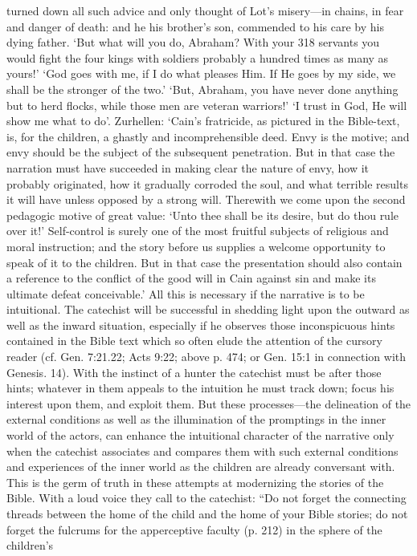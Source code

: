 turned down all such advice and only thought of Lot’s misery—in chains, in fear and danger of death: and he his brother’s son, commended to his care by his dying father. ‘But what will you do, Abraham? With your 318 servants you would fight the four kings with soldiers probably a hundred times as many as yours!’ ‘God goes with me, if I do what pleases Him. If He goes by my side, we shall be the stronger of the two.’ ‘But, Abraham, you have never done anything but to herd flocks, while those men are veteran warriors!’ ‘I trust in God, He will show me what to do’. Zurhellen: ‘Cain’s fratricide, as pictured in the Bible-text, is, for the children, a ghastly and incomprehensible deed. Envy is the motive; and envy should be the subject of the subsequent penetration. But in that case the narration must have succeeded in making clear the nature of envy, how it probably originated, how it gradually corroded the soul, and what terrible results it will have unless opposed by a strong will. Therewith we come upon the second pedagogic motive of great value: ‘Unto thee shall be its desire, but do thou rule over it!’ Self-control is surely one of the most fruitful subjects of religious and moral instruction; and the story before us supplies a welcome opportunity to speak of it to the children. But in that case the presentation should also contain a reference to the conflict of the good will in Cain against sin and make its ultimate defeat conceivable.’ All this is necessary if the narrative is to be intuitional. The catechist will be successful in shedding light upon the outward as well as the inward situation, especially if he observes those inconspicuous hints contained in the Bible text which so often elude the attention of the cursory reader (cf. Gen. 7:21.22; Acts 9:22; above p. 474; or Gen. 15:1 in connection with Genesis. 14). With the instinct of a hunter the catechist must be after those hints; whatever in them appeals to the intuition he must track down; focus his interest upon them, and exploit them. But these processes—the delineation of the external conditions as well as the illumination of the promptings in the inner world of the actors, can enhance the intuitional character of the narrative only when the catechist associates and compares them with such external conditions and experiences of the inner world as the children are already conversant with. This is the germ of truth in these attempts at modernizing the stories of the Bible. With a loud voice they call to the catechist: “Do not forget the connecting threads between the home of the child and the home of your Bible stories; do not forget the fulcrums for the apperceptive faculty (p. 212) in the sphere of the children’s
